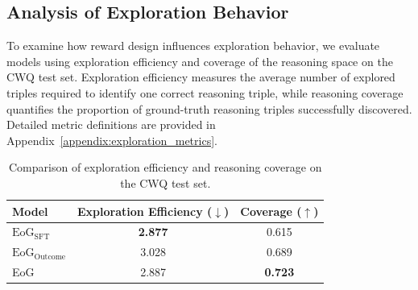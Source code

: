



\subsection{Analysis of Exploration Behavior}
\label{sec:exploration_analysis}

To examine how reward design influences exploration behavior, we evaluate models using exploration efficiency and coverage of the reasoning space on the CWQ test set.
Exploration efficiency measures the average number 
of explored triples required to identify one correct reasoning triple, 
while reasoning coverage quantifies the proportion of ground-truth reasoning triples 
successfully discovered. Detailed metric definitions are provided in Appendix~\ref{appendix:exploration_metrics}.

\begin{table}[ht]
\centering
\caption{Comparison of exploration efficiency and reasoning coverage on the CWQ test set.}
\label{tab:exploration_results}
\begin{tabular}{lcc}
\toprule
\textbf{Model} & \textbf{Exploration Efficiency ($\downarrow$)} & \textbf{Coverage ($\uparrow$)} \\ \midrule
$\text{EoG}_{\text{SFT}}$      & \textbf{2.877} & 0.615 \\
$\text{EoG}_{\text{Outcome}}$  & 3.028          & 0.689 \\
EoG           & 2.887          & \textbf{0.723} \\ \bottomrule
\end{tabular}
\end{table}

